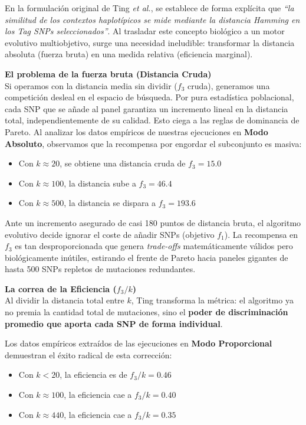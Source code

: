 \documentclass[11pt,a4paper]{article}
\begin{document}
En la formulación original de Ting \textit{et al.}, se establece de forma explícita que \textit{``la similitud de los contextos haplotípicos se mide mediante la distancia Hamming en los Tag SNPs seleccionados''}. Al trasladar este concepto biológico a un motor evolutivo multiobjetivo, surge una necesidad ineludible: transformar la distancia absoluta (fuerza bruta) en una medida relativa (eficiencia marginal).

\textbf{El problema de la fuerza bruta (Distancia Cruda)}\\
Si operamos con la distancia media sin dividir ($f_3$ cruda), generamos una competición desleal en el espacio de búsqueda. Por pura estadística poblacional, cada SNP que se añade al panel garantiza un incremento lineal en la distancia total, independientemente de su calidad. 
Esto ciega a las reglas de dominancia de Pareto. Al analizar los datos empíricos de nuestras ejecuciones en \textbf{Modo Absoluto}, observamos que la recompensa por engordar el subconjunto es masiva:
\begin{itemize}
    \item Con $k \approx 20$, se obtiene una distancia cruda de $f_3 = 15.0$
    \item Con $k \approx 100$, la distancia sube a $f_3 = 46.4$
    \item Con $k \approx 500$, la distancia se dispara a $f_3 = 193.6$
\end{itemize}

Ante un incremento asegurado de casi 180 puntos de distancia bruta, el algoritmo evolutivo decide ignorar el coste de añadir SNPs (objetivo $f_1$). La recompensa en $f_3$ es tan desproporcionada que genera \textit{trade-offs} matemáticamente válidos pero biológicamente inútiles, estirando el frente de Pareto hacia paneles gigantes de hasta 500 SNPs repletos de mutaciones redundantes.

\textbf{La correa de la Eficiencia ($f_3 / k$)}\\
Al dividir la distancia total entre $k$, Ting transforma la métrica: el algoritmo ya no premia la cantidad total de mutaciones, sino el \textbf{poder de discriminación promedio que aporta cada SNP de forma individual}. 

Los datos empíricos extraídos de las ejecuciones en \textbf{Modo Proporcional} demuestran el éxito radical de esta corrección:
\begin{itemize}
    \item Con $k < 20$, la eficiencia es de $f_3/k = \mathbf{0.46}$
    \item Con $k \approx 100$, la eficiencia cae a $f_3/k = \mathbf{0.40}$
    \item Con $k \approx 440$, la eficiencia cae a $f_3/k = \mathbf{0.35}$
\end{itemize}
\end{document}

